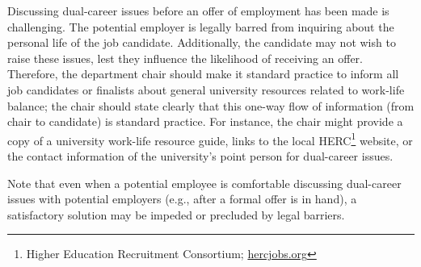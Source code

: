Discussing dual-career issues before an offer of employment has been made is challenging.  The potential employer is legally barred from inquiring about the personal life of the job candidate. Additionally, the candidate may not wish to raise these issues, lest they influence the likelihood of receiving an offer.  Therefore, the department chair should make it standard practice to inform all job candidates or finalists about general university resources related to work-life balance; the chair should state clearly that this one-way flow of information (from chair to candidate) is standard practice.  For instance, the chair might provide a copy of a university work-life resource guide, links to the local HERC\footnote{Higher Education Recruitment Consortium; \href{http://hercjobs.org}{hercjobs.org}} website, or the contact information of the university's point person for dual-career issues. 

Note that even when a potential employee is comfortable discussing dual-career issues with potential employers (e.g., after a formal offer is in hand), a satisfactory solution may be impeded or precluded by legal barriers.

















